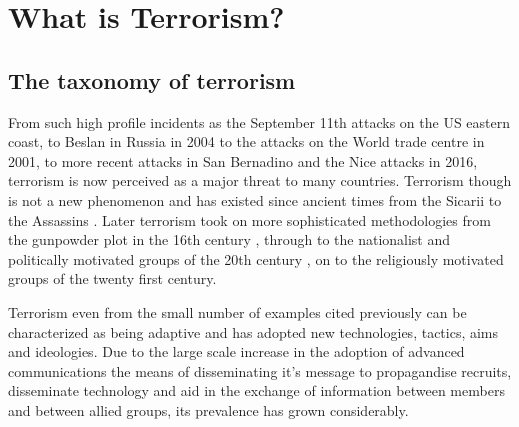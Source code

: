\chapter{What is Terrorism?}

\section{The taxonomy of terrorism}

From such high profile incidents as the September 11th attacks on the US eastern coast, to Beslan in Russia in 2004 to the attacks on the World trade centre in 2001, to more recent attacks in San Bernadino and the Nice attacks in 2016, terrorism is now perceived as a major threat to many countries. Terrorism though is not a new phenomenon and has existed since ancient times from the Sicarii \citep{horsley1979sicarii} to the Assassins \citep{sloan2009historical}. Later terrorism took on more sophisticated methodologies from the gunpowder plot in the 16th century \citep{fraser2010gunpowder}, through to the nationalist and politically motivated groups of the 20th century , on to the religiously motivated groups of the twenty first century.

Terrorism even from the small number of examples cited previously can be characterized as being adaptive and has adopted new technologies, tactics, aims and ideologies. Due to the large scale increase in the adoption of advanced communications the means of disseminating it's message to propagandise  recruits, disseminate technology and aid in the exchange of information between members and between allied groups, its prevalence has grown considerably.

